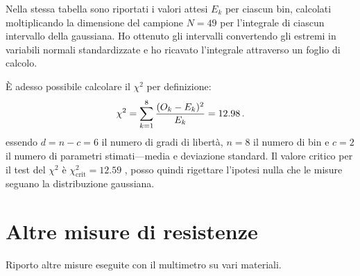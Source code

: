             Nella stessa tabella sono riportati i valori attesi $E_k$ per ciascun bin, calcolati moltiplicando la dimensione del campione $N = 49$ per l'integrale di ciascun intervallo della gaussiana. Ho ottenuto gli intervalli convertendo gli estremi in variabili normali standardizzate e ho ricavato l'integrale attraverso un foglio di calcolo.

            È adesso possibile calcolare il $\chi^2$ per definizione:
            \begin{equation*}
                \chi^2
                = \sum_{k=1}^{8} \frac{(O_k - E_k)^2}{E_k}
                = \num{12.98}
                \,.
            \end{equation*}
            essendo $d = n - c = 6$ il numero di gradi di libertà, $n = 8$ il numero di bin e $c = 2$ il numero di parametri stimati---media e deviazione standard. Il valore critico per il test del $\chi^2$ è $\chi^2_\text{crit}= \num{12.59}$ \cite{chi2-table}, posso quindi rigettare l'ipotesi nulla che le misure seguano la distribuzione gaussiana.

    \section{Altre misure di resistenze}
            Riporto altre misure eseguite con il multimetro su vari materiali.
            

